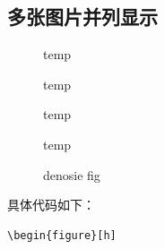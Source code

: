 \documentclass[12pt,oneside]{book}
\begin{document}
\begin{common-format}
\section{多张图片并列显示}
\label{sec:多张图片并列显示}

\begin{figure}[H]
\label{fig:四栏图片}
\begin{multicols}{4}
\begin{linefig}{temp}
\end{linefig}
\begin{linefig}{temp}
\end{linefig}
\begin{linefig}{temp}
\end{linefig}
\begin{linefig}{temp}
\end{linefig}
\end{multicols}
\caption{denosie fig}
\label{fig:denosie fig}
\end{figure}

具体代码如下：
\begin{Verbatim}
\begin{figure}[h]


\end{Verbatim}
\end{common-format}
\end{document}
